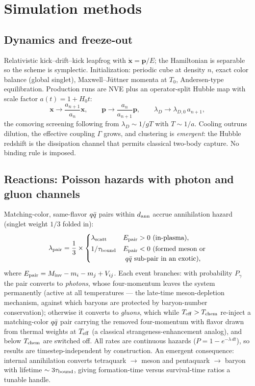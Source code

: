 \section{Simulation methods}
\label{sec:methods}

\subsection{Dynamics and freeze-out}

Relativistic kick--drift--kick leapfrog with $\dot{\mathbf x}=\mathbf p/E$;
the Hamiltonian is separable so the scheme is symplectic.  Initialization:
periodic cube at density $n$, exact color balance (global singlet),
Maxwell--J\"uttner momenta at $T_0$, Andersen-type equilibration.
Production runs are NVE plus an operator-split Hubble map with scale factor
$a(t)=1+H_0 t$:
\begin{equation}
\mathbf x \to \frac{a_{n+1}}{a_n}\mathbf x,\qquad
\mathbf p \to \frac{a_n}{a_{n+1}}\mathbf p,\qquad
\lambda_D \to \lambda_{D,0}\, a_{n+1},
\label{eq:hubble}
\end{equation}
the comoving screening following from $\lambda_D\sim 1/gT$ with
$T\sim 1/a$.  Cooling outruns dilution, the effective coupling
$\Gamma$ grows, and clustering is \emph{emergent}: the Hubble redshift is
the dissipation channel that permits classical two-body capture.  No
binding rule is imposed.

\subsection{Reactions: Poisson hazards with photon and gluon channels}
\label{sec:reactions}

Matching-color, same-flavor $q\bar{q}$ pairs within $d_{\rm ann}$ accrue
annihilation hazard (singlet weight $1/3$ folded in):
\begin{equation}
\lambda_{\rm pair} = \frac{1}{3}\times
\begin{cases}
\lambda_{\rm scatt} & E_{\rm pair}>0 \ \text{(in-plasma)},\\[2pt]
1/\tau_{\rm bound} & E_{\rm pair}<0 \ \text{(formed meson or}\\
& \text{\ $q\bar{q}$ sub-pair in an exotic)},
\end{cases}
\label{eq:hazards}
\end{equation}
where $E_{\rm pair}=M_{\rm inv}-m_i-m_j+V_{ij}$.  Each event branches:
with probability $P_\gamma$ the pair converts to \emph{photons}, whose
four-momentum leaves the system permanently (active at all temperatures ---
the late-time meson-depletion mechanism, against which baryons are
protected by baryon-number conservation); otherwise it converts to
\emph{gluons}, which while $T_{\mathrm{eff}}>T_{\mathrm{chem}}$ re-inject a matching-color
$q\bar{q}$ pair carrying the removed four-momentum with flavor drawn from
thermal weights at $T_{\mathrm{eff}}$ (a classical strangeness-enhancement analog),
and below $T_{\mathrm{chem}}$ are switched off.  All rates are continuous hazards
($P=1-e^{-\lambda\,dt}$), so results are timestep-independent by
construction.  An emergent consequence: internal annihilation converts
tetraquark $\to$ meson and pentaquark $\to$ baryon with lifetime
$\sim 3\tau_{\rm bound}$, giving formation-time versus survival-time ratios
a tunable handle.

